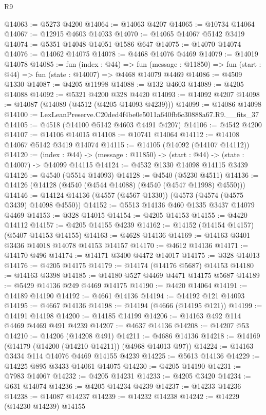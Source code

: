 \begin{lexlean}{R9}
\begin{coremodule}
@14063 := @5273 @4200
@14064 := @14063 @4207
@14065 := @10734 @14064
@14067 := @12915 @4603 @14033
@14070 := @14065 @14067 @5142 @3419
@14074 := @5351 @14048 @14051 @1586 @647
@14075 := @14070 @14074
@14076 := @14062 @14075
@14078 := @4468 @14076 @4469
@14079 := @14019 @14078
@14085 := fun (index : @44) =>
  fun (message : @11850) => fun (start : @44) => fun (state : @14007) => @4468 @14079 @4469
@14086 := @4509 @1330
@14087 := @4205 @11998
@14088 := @132 @4603
@14089 := @4205 @14088
@14092 := @5321 @4200 @328 @4420
@14093 := @14092 @4207
@14098 := @14087 (@14089 (@4512 (@4205 @14093 @4239)))
@14099 := @14086 @14098
@14100 := LexLeanPreserve.C20ded4f4be0e5011a640fb6c30888a67.R9.__fits_37
@14105 := @4518 (@14100 @5142 @4603 @4491 @4207)
@14106 := @4542 @4200
@14107 := @14106 @14015
@14108 := @10741 @14064
@14112 := @14108 @14067 @5142 @3419 @14074
@14115 := @14105 (@14092 (@14107 @14112))
@14120 := (index : @44) -> (message : @11850) -> (start : @44) -> (state : @14007) -> @14099 @14115
@14124 := @4532 @1330 @14098 @14115 @3439
@14126 := @4540 (@5514 @14093)
@14128 := @4540 (@5230 @4511)
@14136 := @14126 (@14128 (@4540 (@4544 @14088) (@4540 (@4547 @11998) @4550)))
@14146 := @14124 @14136 (@4557 (@4567 @1330)) (@4573 (@4574 (@4575 @3439) @14098 @4550))
@14152 := @5513 @14136 @460 @1335 @3437 @14079 @4469
@14153 := @328 @14015
@14154 := @4205 @14153
@14155 := @4420 @14112
@14157 := @4205 @14155 @4239
@14162 := @14152 (@14154 @14157) (@5407 @14153 @14155)
@14163 := @4628 @14136
@14169 := @14163 @3401 @3436 @14018 @14078 @14153 @14157
@14170 := @4612 @14136
@14171 := @14170 @496
@14174 := @14171 @3400 @4472 @14017
@14175 := @328 @14013
@14176 := @4205 @14175
@14179 := @14174 (@14176 @5687) @14153
@14180 := @14163 @3398
@14185 := @14180 @527 @4469 @4471 @14175 @5687
@14189 := @5429 @14136 @249 @4469 @14175
@14190 := @4420 @14064
@14191 := @14189 @14190
@14192 := @4661 @14136
@14194 := @14192 @121 @14093
@14195 := @4667 @14136
@14198 := @14194 (@4666 (@14195 @121))
@14199 := @14191 @14198
@14200 := @14185 @14199
@14206 := @14163 @492 @114 @4469 @4469 @491 @4239
@14207 := @4637 @14136
@14208 := @14207 @53
@14210 := @14206 (@14208 @491)
@14211 := @4686 @14136
@14218 := @14169 (@14179 (@14200 (@14210 @14211)) (@4968 @14013 @97))
@14224 := @14163 @3434 @114 @14076 @4469 @14155 @4239
@14225 := @5613 @14136
@14229 := @14225 @895 @3433 @14061 @14075
@14230 := @4205 @14190
@14231 := @7983 @14067
@14232 := @4205 @14231
@14233 := @4205 @3420
@14234 := @631 @14074
@14236 := @4205 @14234 @4239
@14237 := @14233 @14236
@14238 := @14087 @14237
@14239 := @14232 @14238
@14242 := @14229 (@14230 @14239) @14155

\end{coremodule}
\end{lexlean}
